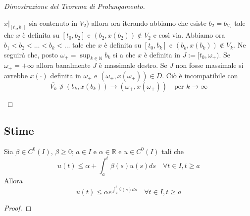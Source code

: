 \begin{proof}[Dimostrazione del Teorema di Prolungamento]
\begin{enumerate}[label = \alph*)]
        \(x|_{[t_{0},b_{1}]}\) sia contenuto in \(V_{2}\)) allora ora iterando
        abbiamo che esiste \(b_{2} = b_{V_{2}}\) tale che \(x\) è definita su 
        \([t_{0}, b_{2}]\) e \((b_{2}, x(b_{2})) \not\in V_{2}\) e così via.
        Abbiamo ora \(b_{1} < b_{2}<\dots < b_k <\dots\) tale che \(x\) è
        definita su \([t_{0}, b_k]\) e \((b_k, x(b_k)) \not\in V_{k}\). Ne
        seguirà che, posto \(\omega_+ = \sup_{k \in \mathbb{N}}b_k \) si a che
        \(x\) è definita in \(J := [t_{0}, \omega_+)\). Se \(\omega_+ = +\infty\)
        allora banalmente \(J\) è massimale destro. Se \(J\) non fosse massimale
        si avrebbe \(x(\cdot )\) definita in \(\omega_+\) e \((\omega_+,
        x(\omega_+)) \in D\). Ciò è incompatibile con 
        \[
            \overline{V_k} \not\ni (b_k, x(b_k)) \to (\omega_+, x(\omega_+)) \quad \text{per }
            k \to \infty
        \]
\end{enumerate}
\end{proof}

\subsection{Stime}
\begin{theorem}
    Sia \(\beta \in C^{0}(I)\), \(\beta \ge 0\); \(a \in I\) e \(\alpha \in
    \mathbb{R}\) e \(u \in C^{0}(I)\) tali che
    \[
        u(t) \le \alpha + \int_{a}^{t} \beta(s) u(s) ds \quad \forall t \in I, t
        \ge a
    \]
    Allora
    \[
        u(t) \le \alpha e^{\int_{a}^{t} \beta(s) ds} \quad \forall t \in I, t
        \ge a
    \]
\end{theorem}
\begin{proof}
\end{proof}

